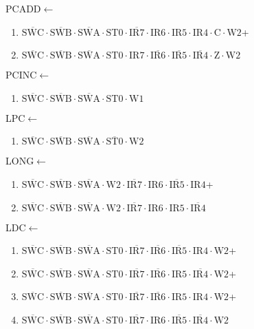 \documentclass[UTF8]{ctexart}
\begin{document}
PCADD$\leftarrow$
\begin{enumerate}[\indent\indent]
	\item$\overline{\text{SWC}}\cdot\overline{\text{SWB}}\cdot\overline{\text{SWA}}\cdot\text{ST0}\cdot\overline{\text{IR7}}\cdot{\text{IR6}}\cdot{\text{IR5}}\cdot{\text{IR4}}\cdot\text{C}\cdot\text{W2}$+
	\item$\overline{\text{SWC}}\cdot\overline{\text{SWB}}\cdot\overline{\text{SWA}}\cdot\text{ST0}\cdot{\text{IR7}}\cdot\overline{\text{IR6}}\cdot\overline{\text{IR5}}\cdot\overline{\text{IR4}}\cdot\text{Z}\cdot\text{W2}$
\end{enumerate}
PCINC$\leftarrow$
\begin{enumerate}[\indent\indent]
	\item$\overline{\text{SWC}}\cdot\overline{\text{SWB}}\cdot\overline{\text{SWA}}\cdot\text{ST0}\cdot\text{W1}$
\end{enumerate}
LPC$\leftarrow$
\begin{enumerate}[\indent\indent]
	\item$\overline{\text{SWC}}\cdot\overline{\text{SWB}}\cdot\overline{\text{SWA}}\cdot\overline{\text{ST0}}\cdot\text{W2}$
\end{enumerate}
LONG$\leftarrow$
\begin{enumerate}[\indent\indent]
	\item$\overline{\text{SWC}}\cdot\overline{\text{SWB}}\cdot\overline{\text{SWA}}\cdot\text{W2}\cdot\overline{\text{IR7}}\cdot{\text{IR6}}\cdot\overline{\text{IR5}}\cdot{\text{IR4}}$+
	\item$\overline{\text{SWC}}\cdot\overline{\text{SWB}}\cdot\overline{\text{SWA}}\cdot\text{W2}\cdot\overline{\text{IR7}}\cdot{\text{IR6}}\cdot{\text{IR5}}\cdot\overline{\text{IR4}}$
\end{enumerate}
LDC$\leftarrow$
\begin{enumerate}[\indent\indent]
	\item$\overline{\text{SWC}}\cdot\overline{\text{SWB}}\cdot\overline{\text{SWA}}\cdot\text{ST0}\cdot\overline{\text{IR7}}\cdot\overline{\text{IR6}}\cdot\overline{\text{IR5}}\cdot\text{IR4}\cdot\text{W2}$+
	\item$\overline{\text{SWC}}\cdot\overline{\text{SWB}}\cdot\overline{\text{SWA}}\cdot\text{ST0}\cdot\overline{\text{IR7}}\cdot\overline{\text{IR6}}\cdot{\text{IR5}}\cdot\overline{\text{IR4}}\cdot\text{W2}$+
	\item$\overline{\text{SWC}}\cdot\overline{\text{SWB}}\cdot\overline{\text{SWA}}\cdot\text{ST0}\cdot\overline{\text{IR7}}\cdot\overline{\text{IR6}}\cdot\text{IR5}\cdot\text{IR4}\cdot\text{W2}$+
	\item$\overline{\text{SWC}}\cdot\overline{\text{SWB}}\cdot\overline{\text{SWA}}\cdot\text{ST0}\cdot\overline{\text{IR7}}\cdot{\text{IR6}}\cdot\overline{\text{IR5}}\cdot\overline{\text{IR4}}\cdot\text{W2}$
\end{enumerate}
\end{document}
